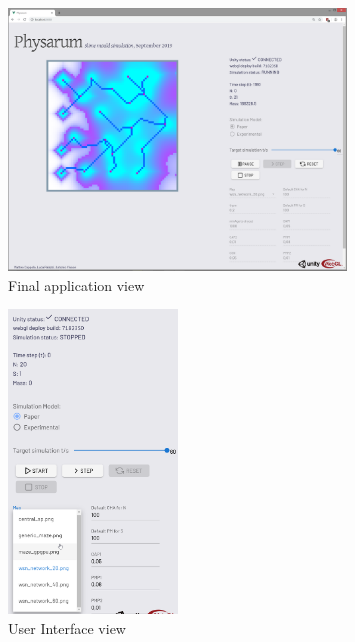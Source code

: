 \begin{figure}
  \centering
    \includegraphics[width=0.8\textwidth]{UI1}%
    
  \caption{Final application view}
  \label{fig:swstack1}
\end{figure}

\begin{figure}
  \centering
    \includegraphics[width=0.4\textwidth]{UI2}%
    
  \caption{User Interface view}
  \label{fig:swstack1}
\end{figure}

